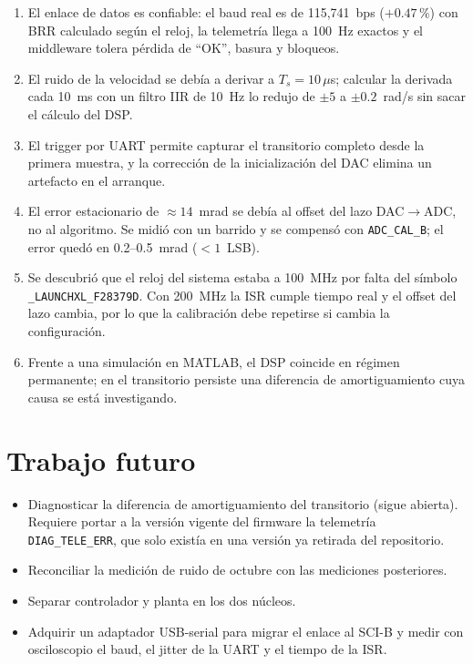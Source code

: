 \documentclass[11pt,a4paper]{article}
\begin{document}
\begin{enumerate}
    \item El enlace de datos es confiable: el baud real es de 115{,}741~bps ($+0.47\,\%$) con BRR calculado según el reloj, la telemetría llega a 100~Hz exactos y el middleware tolera pérdida de ``OK'', basura y bloqueos.
    \item El ruido de la velocidad se debía a derivar a $T_s=10\,\mu$s; calcular la derivada cada 10~ms con un filtro IIR de 10~Hz lo redujo de $\pm 5$ a $\pm 0.2$~rad/s sin sacar el cálculo del DSP.
    \item El trigger por UART permite capturar el transitorio completo desde la primera muestra, y la corrección de la inicialización del DAC elimina un artefacto en el arranque.
    \item El error estacionario de $\approx 14$~mrad se debía al offset del lazo DAC$\rightarrow$ADC, no al algoritmo. Se midió con un barrido y se compensó con \texttt{ADC\_CAL\_B}; el error quedó en 0.2--0.5~mrad ($<1$~LSB).
    \item Se descubrió que el reloj del sistema estaba a 100~MHz por falta del símbolo \texttt{\_LAUNCHXL\_F28379D}. Con 200~MHz la ISR cumple tiempo real y el offset del lazo cambia, por lo que la calibración debe repetirse si cambia la configuración.
    \item Frente a una simulación en MATLAB, el DSP coincide en régimen permanente; en el transitorio persiste una diferencia de amortiguamiento cuya causa se está investigando.
\end{enumerate}

\section{Trabajo futuro}

\begin{itemize}
    \item Diagnosticar la diferencia de amortiguamiento del transitorio (sigue abierta). Requiere portar a la versi\'on vigente del firmware la telemetr\'ia \texttt{DIAG\_TELE\_ERR}, que solo exist\'ia en una versi\'on ya retirada del repositorio.
    \item Reconciliar la medici\'on de ruido de octubre con las mediciones posteriores.
    \item Separar controlador y planta en los dos n\'ucleos.
    \item Adquirir un adaptador USB-serial para migrar el enlace al SCI-B y medir con osciloscopio el baud, el jitter de la UART y el tiempo de la ISR.
\end{itemize}
\end{document}
